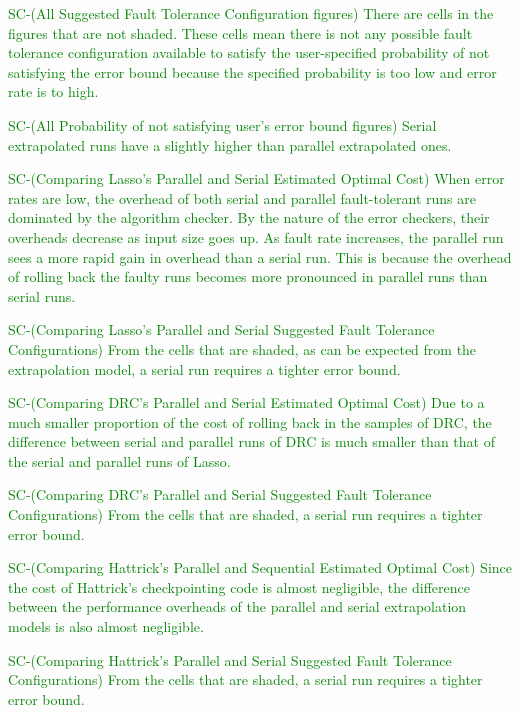 \documentclass[10pt, conference, compsocconf]{IEEEtran}
\newcommand{\sui}[1]{%
  \textcolor{green}{SC-#1}
}
\begin{document}
\sui{(All Suggested Fault Tolerance Configuration figures)
There are cells in the figures that are not shaded. These cells mean there is not any possible fault tolerance configuration available to satisfy the user-specified probability of not satisfying the error bound because the specified probability is too low and error rate is to high.}

\sui{(All Probability of not satisfying user's error bound figures)
Serial extrapolated runs have a slightly higher than parallel extrapolated ones.}

\sui{(Comparing Lasso's Parallel and Serial Estimated Optimal Cost)
When error rates are low, the overhead of both serial and parallel fault-tolerant runs are dominated by the algorithm checker. By the nature of the error checkers, their overheads decrease as input size goes up.
As fault rate increases, the parallel run sees a more rapid gain in overhead than a serial run. This is because the overhead of rolling back the faulty runs becomes more pronounced in parallel runs than serial runs.}

\sui{(Comparing Lasso's Parallel and Serial Suggested Fault Tolerance Configurations)
From the cells that are shaded, as can be expected from the extrapolation model, a serial run requires a tighter error bound. }

\sui{(Comparing DRC's Parallel and Serial Estimated Optimal Cost)
Due to a much smaller proportion of the cost of rolling back in the samples of DRC, the difference between serial and parallel runs of DRC is much smaller than that of the serial and parallel runs of Lasso.}

\sui{(Comparing DRC's Parallel and Serial Suggested Fault Tolerance Configurations)
From the cells that are shaded, a serial run requires a tighter error bound.}

\sui{(Comparing Hattrick's Parallel and Sequential Estimated Optimal Cost)
Since the cost of Hattrick's checkpointing code is almost negligible, the difference between the performance overheads of the parallel and serial extrapolation models is also almost negligible.}

\sui{(Comparing Hattrick's Parallel and Serial Suggested Fault Tolerance Configurations)
From the cells that are shaded, a serial run requires a tighter error bound.}
\end{document}
